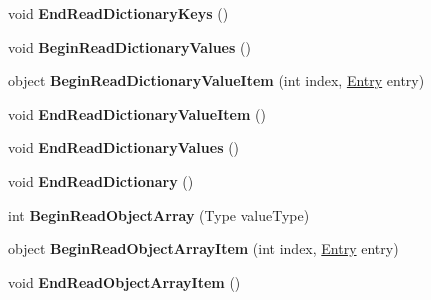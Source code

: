 \begin{DoxyCompactItemize}
\item 
\mbox{\label{interface_serialization_1_1_i_storage_a4d7be7471ebc9555ec62f3d1e91b53a8}} 
void {\bfseries End\+Read\+Dictionary\+Keys} ()
\item 
\mbox{\label{interface_serialization_1_1_i_storage_ad25b5e89d4ae0b91dccf8c0ce2187f15}} 
void {\bfseries Begin\+Read\+Dictionary\+Values} ()
\item 
\mbox{\label{interface_serialization_1_1_i_storage_ab25360e5a7b453f7cbcf2a8d98ea0eb8}} 
object {\bfseries Begin\+Read\+Dictionary\+Value\+Item} (int index, \hyperlink{class_serialization_1_1_entry}{Entry} entry)
\item 
\mbox{\label{interface_serialization_1_1_i_storage_a34f240c50bd8a6811cdde7d564fab443}} 
void {\bfseries End\+Read\+Dictionary\+Value\+Item} ()
\item 
\mbox{\label{interface_serialization_1_1_i_storage_af76c715808ff9cca9b89c995a556ec6b}} 
void {\bfseries End\+Read\+Dictionary\+Values} ()
\item 
\mbox{\label{interface_serialization_1_1_i_storage_a361427cb53d37e663b456b97d087575b}} 
void {\bfseries End\+Read\+Dictionary} ()
\item 
\mbox{\label{interface_serialization_1_1_i_storage_a4d7741da3862a1398e0566d362eb0827}} 
int {\bfseries Begin\+Read\+Object\+Array} (Type value\+Type)
\item 
\mbox{\label{interface_serialization_1_1_i_storage_a3d3197fc76431c156d291c5e46240018}} 
object {\bfseries Begin\+Read\+Object\+Array\+Item} (int index, \hyperlink{class_serialization_1_1_entry}{Entry} entry)
\item 
\mbox{\label{interface_serialization_1_1_i_storage_a0b02021d3b80d7a3b66657aca7e50683}} 
void {\bfseries End\+Read\+Object\+Array\+Item} ()
\item 

\end{DoxyCompactItemize}
